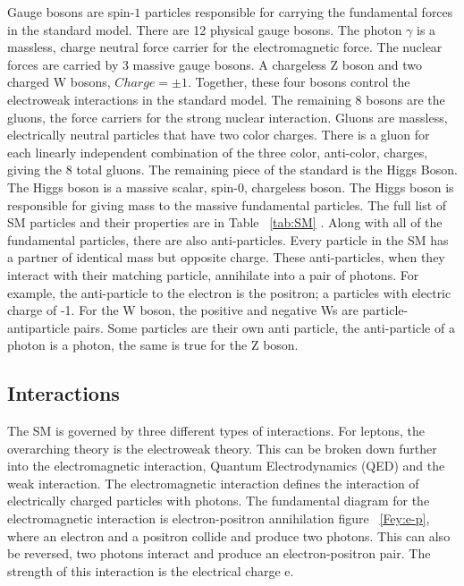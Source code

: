 \indent Gauge bosons are spin-${1}$ particles responsible for carrying the fundamental forces in the standard model. There are 12 physical gauge bosons. The photon ${\gamma}$ is a massless, charge neutral force carrier for the electromagnetic force. The nuclear forces are carried by 3 massive gauge bosons. A chargeless Z boson and two charged W bosons, ${Charge = \pm 1}$. Together, these four bosons control the electroweak interactions in the standard model. The remaining 8 bosons are the gluons, the force carriers for the strong nuclear interaction. Gluons are massless, electrically neutral particles that have two color charges. There is a gluon for each linearly independent combination of the three color, anti-color, charges, giving the 8 total gluons. \newline
\indent The remaining piece of the standard is the Higgs Boson. The Higgs boson is a massive scalar, spin-${0}$, chargeless boson. The Higgs boson is responsible for giving mass to the massive fundamental particles. The full list of SM particles and their properties are in Table ~\ref{tab:SM}\newline
\indent. Along with all of the fundamental particles, there are also anti-particles. Every particle in the SM has a partner of identical mass but opposite charge. These anti-particles, when they interact with their matching particle, annihilate into a pair of photons. For example, the anti-particle to the electron is the positron; a particles with electric charge of -1. For the W boson, the positive and negative Ws are particle-antiparticle pairs. Some particles are their own anti particle, the anti-particle of a photon is a photon, the same is true for the Z boson.\newline
\subsection{Interactions}
The SM is governed by three different types of interactions. For leptons, the overarching theory is the electroweak theory. This can be broken down further into the electromagnetic interaction, Quantum Electrodynamics (QED) and the weak interaction. The electromagnetic interaction defines the interaction of electrically charged particles with photons. The fundamental diagram for the electromagnetic interaction is electron-positron annihilation figure ~\ref{Fey:e-p}, where an electron and a positron collide and produce two photons. This can also be reversed, two photons interact and produce an electron-positron pair. The strength of this interaction is the electrical charge e. \newline

